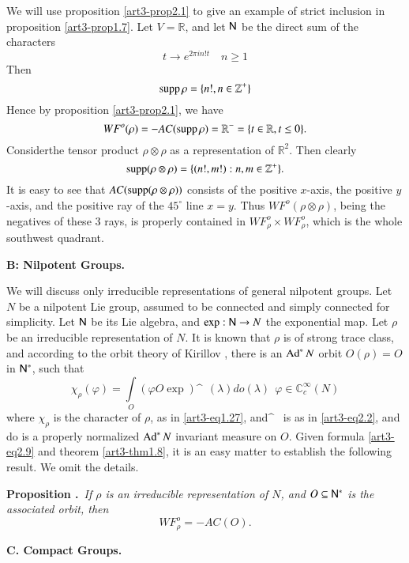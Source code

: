 We will use proposition \ref{art3-prop2.1} to give an example of strict inclusion in proposition \ref{art3-prop1.7}. Let $V=\mathbb{R}$, and let $\mathsf{N}$ be the direct sum of the characters
$$
t\to e^{2\pi in!t}\quad n\geq 1
$$
Then 
$$
\operatorname{supp} \rho=\{n!,n\in \mathbb{Z}^{+}\}
$$
Hence by proposition \ref{art3-prop2.1}, we have
$$
WF^{o}(\rho)=-AC(\operatorname{supp} \rho)=\mathbb{R}^{-}=\{t\in \mathbb{R}, t\leq 0\}.
$$
Consider\pageoriginale the tensor product $\rho\otimes \rho$ as a representation of $\mathbb{R}^{2}$. Then clearly
$$
\operatorname{supp}(\rho\otimes \rho)=\{(n!,m!):n,m\in \mathbb{Z}^{+}\}.
$$
It is easy to see that $AC(\operatorname{supp} (\rho\otimes \rho))$ consists of the positive $x$-axis, the positive $y$-axis, and the positive ray of the $45^{\circ}$ line $x=y$. Thus $WF^{o}(\rho\otimes\rho)$, being the negatives of these 3 rays, is properly contained in $WF^{o}_{\rho}\times WF^{o}_{\rho}$, which is the whole southwest quadrant.

\bigskip
\noindent
{\bf B: Nilpotent Groups.}
\smallskip

We will discuss only irreducible representations of general nilpotent groups. Let $N$ be a nilpotent Lie group, assumed to be connected and simply connected for simplicity. Let $\mathsf{N}$ be its Lie algebra, and $\exp:\mathsf{N}\to N$ the exponential map. Let $\rho$ be an irreducible representation of $N$. It is known that $\rho$ is of strong trace class, and according to the orbit theory of Kirillov \cite{art3-K}, there is an $\operatorname{Ad}^{*}N$ orbit $O(\rho)=O$ in $\mathsf{N}^{*}$, such that
\begin{equation*}
\chi_{\rho}(\varphi)=\int\limits_{O}(\varphi O \exp)\sphat \ \ (\lambda) do(\lambda) \ \ \varphi\in \mathbb{C}^{\infty}_{c}(N)\tag{2.9}\label{art3-eq2.9}
\end{equation*}
where $\chi_{\rho}$ is the character of $\rho$, as in \eqref{art3-eq1.27}, and$\sphat$ \ is as in \eqref{art3-eq2.2}, and do is a properly normalized $\operatorname{Ad}^{*}N$ invariant measure on $O$. Given formula \eqref{art3-eq2.9} and theorem \ref{art3-thm1.8}, it is an easy matter to establish the following result. We omit the details.

\medskip
\noindent
{\bf Proposition .\label{art3-prop2.2}}~{\em If $\rho$ is an irreducible representation of $N$, and $O\subseteq \mathsf{N}^{*}$ is the associated orbit, then}
\begin{equation*}
WF^{o}_{\rho}=-AC(O).\tag{2.10}\label{art3-eq2.10}
\end{equation*}

\bigskip
\noindent
{\bf C. Compact Groups.}
\smallskip

